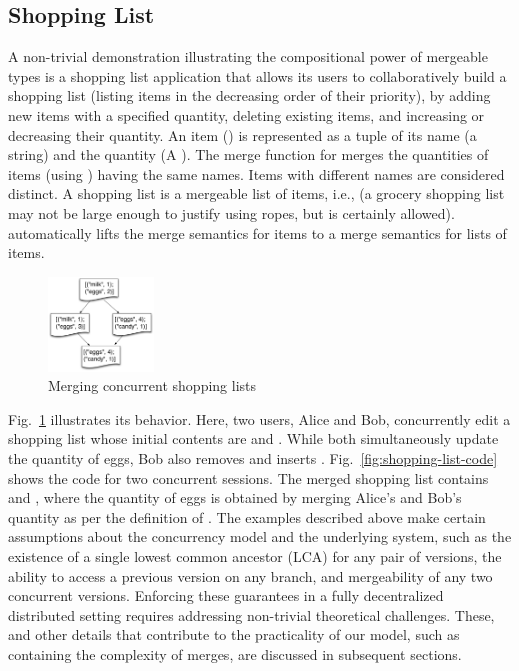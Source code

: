 \subsection{Shopping List}

A non-trivial demonstration illustrating the compositional power of
mergeable types is a shopping list application that allows its users
to collaboratively build a shopping list (listing items in the
decreasing order of their priority), by adding new items with a
specified quantity, deleting existing items, and increasing or
decreasing their quantity. An item () is represented as a
tuple of its name (a string) and the quantity (A ).  The
merge function for  merges the quantities of items (using
) having the same names. Items with different names are
considered distinct. A shopping list is a mergeable list of items,
i.e.,  (a grocery shopping list may not be large enough
to justify using ropes, but  is certainly
allowed).   automatically lifts the merge
semantics for items to a merge semantics for lists of items.
\begin{figure}
  \centering
  \includegraphics[width=0.25\textwidth]{Figures/shopping-list}
  \caption{Merging concurrent shopping lists}
  \label{fig:shopping-list}
  \vspace*{-.35in}
\end{figure}
Fig.~\ref{fig:shopping-list} illustrates its behavior.  Here, two
users, Alice and Bob, concurrently edit a shopping list whose initial
contents are  and . While both simultaneously update
the quantity of eggs, Bob also removes  and inserts .
Fig.~\ref{fig:shopping-list-code} shows the \name code for two
concurrent sessions. The merged shopping list contains  and
, where the quantity of eggs is obtained by merging Alice's
and Bob's quantity as per the definition of .
The examples described above make certain assumptions about the
concurrency model and the underlying system, such as the existence of
a single lowest common ancestor (LCA) for any pair of versions, the
ability to access a previous version on any branch, and mergeability
of any two concurrent versions. Enforcing these guarantees in a fully
decentralized distributed setting requires addressing non-trivial
theoretical challenges. These, and other details that contribute to
the practicality of our model, such as containing the complexity of
merges, are discussed in subsequent sections.


